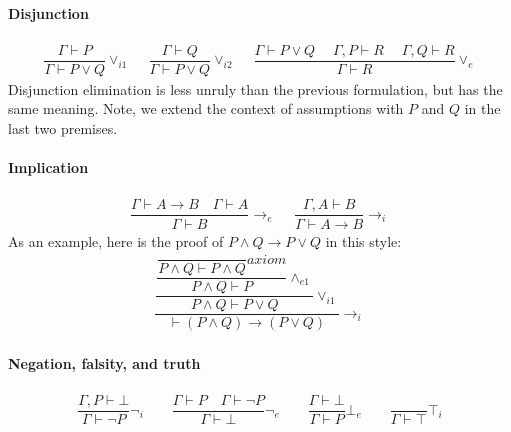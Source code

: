 \paragraph{Disjunction}

\begin{align*}
\dfrac{\Gamma \vdash P}
      {\Gamma \vdash P \vee Q}  {\vee_{i1}}
\quad\;
\dfrac{\Gamma \vdash Q}
      {\Gamma \vdash P \vee Q} {\vee_{i2}}
\quad\;
\dfrac{\Gamma \vdash P \vee Q
  \quad\; \Gamma, P \vdash R
  \quad\; \Gamma, Q \vdash R}
      {\Gamma \vdash R} {\vee_{e}}
\end{align*}
%
Disjunction elimination is less unruly than the previous
formulation, but has the same meaning. Note, we extend the
context of assumptions with $P$ and $Q$ in the last two premises.

\paragraph{Implication}

\begin{align*}
\dfrac{\Gamma \vdash A \rightarrow B \quad \Gamma \vdash A}
      {\Gamma \vdash B} {\rightarrow_e}
\quad\;
\dfrac{\Gamma, A \vdash B}{\Gamma \vdash A \rightarrow B}
 {\rightarrow_i}
\end{align*}
As an example, here is the proof of $P \wedge Q \rightarrow P \vee Q$
in this style:
%
\newcommand{\pAB}{\dfrac{}{P \wedge Q \vdash P \wedge Q} {\textit{axiom}}}
\begin{align*}
  \dfrac{
  \dfrac{\dfrac{\pAB}{P \wedge Q \vdash P} {\wedge_{e1}}}
  {P \wedge Q \vdash P \vee Q} {\vee_{i1}}}
  {\vdash (P \wedge Q) \rightarrow (P \vee Q)} {\rightarrow_{i}}
\end{align*}

\paragraph{Negation,  falsity, and truth}

\begin{align*}
  \dfrac{\Gamma, P \vdash \bot}{\Gamma \vdash \neg P} {\neg_i}
  \qquad
  \dfrac{\Gamma \vdash P \quad \Gamma \vdash \neg P}{\Gamma \vdash \bot} {\neg_e}
  \qquad
  \dfrac{\Gamma \vdash \bot}{\Gamma \vdash P} {\bot_e}
  \qquad
  \dfrac{}{\Gamma \vdash \top} {\top_i}
\end{align*}
